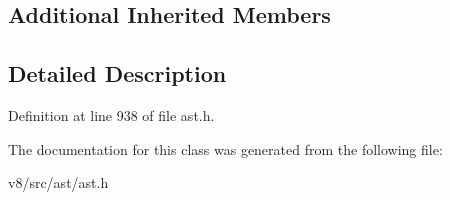 \subsection*{Additional Inherited Members}


\subsection{Detailed Description}


Definition at line 938 of file ast.\+h.



The documentation for this class was generated from the following file\+:\begin{DoxyCompactItemize}
\item 
v8/src/ast/ast.\+h\end{DoxyCompactItemize}
